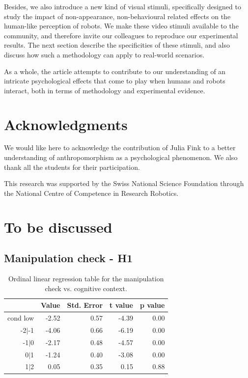 \documentclass[lettersize, noapacite, twoside, HRI]{apa_HRI}
\begin{document}
Besides, we also introduce a new kind of visual stimuli, specifically designed
to study the impact of non-appearance, non-behavioural related effects on the
human-like perception of robots. We make these video stimuli available to the
community, and therefore invite our colleagues to reproduce our experimental
results. The next section describe the specificities of these stimuli, and also
discuss how such a methodology can apply to real-world scenarios.

As a whole, the article attempts to contribute to our understanding of an
intricate psychological effects that come to play when humans and robots
interact, both in terms of methodology and experimental evidence.


\section*{Acknowledgments}

We would like here to acknowledge the contribution of Julia Fink to a better
understanding of anthropomorphism as a psychological phenomenon. We also thank
all the students for their participation.

This research was supported by the Swiss National Science Foundation through the
National Centre of Competence in Research Robotics.

\newpage


\section {To be discussed}


\subsection{Manipulation check - H1}


\begin{table}[ht]
\caption{Ordinal linear regression table for the manipulation check vs. cognitive context.}
\centering
\begin{tabular}{rrrrr}
  \hline
 & Value & Std. Error & t value & p value \\ 
  \hline
cond low & -2.52 & 0.57 & -4.39 & 0.00 \\ 
  -2$|$-1 & -4.06 & 0.66 & -6.19 & 0.00 \\ 
  -1$|$0 & -2.17 & 0.48 & -4.57 & 0.00 \\ 
  0$|$1 & -1.24 & 0.40 & -3.08 & 0.00 \\ 
  1$|$2 & 0.05 & 0.35 & 0.15 & 0.88 \\ 
   \hline
\end{tabular}
\end{table}
\end{document}
